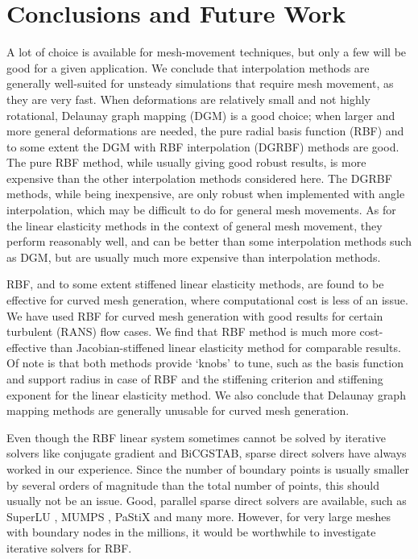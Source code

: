 \chapter{Conclusions and Future Work}

A lot of choice is available for mesh-movement techniques, but only a few will be good for a given application. We conclude that interpolation methods are generally well-suited for unsteady simulations that require mesh movement, as they are very fast. When deformations are relatively small and not highly rotational, Delaunay graph mapping (DGM) is a good choice; when larger and more general deformations are needed, the pure radial basis function (RBF) and to some extent the DGM with RBF interpolation (DGRBF) methods are good. The pure RBF method, while usually giving good robust results, is more expensive than the other interpolation methods considered here. The DGRBF methods, while being inexpensive, are only robust when implemented with angle interpolation, which may be difficult to do for general mesh movements. As for the linear elasticity methods in the context of general mesh movement, they perform reasonably well, and can be better than some interpolation methods such as DGM, but are usually much more expensive than interpolation methods.

RBF, and to some extent stiffened linear elasticity methods, are found to be effective for curved mesh generation, where computational cost is less of an issue. We have used RBF for curved mesh generation with good results for certain turbulent (RANS) flow cases. We find that RBF method is much more cost-effective than Jacobian-stiffened linear elasticity method for comparable results. Of note is that both methods provide `knobs' to tune, such as the basis function and support radius in case of RBF and the stiffening criterion and stiffening exponent for the linear elasticity method. We also conclude that Delaunay graph mapping methods are generally unusable for curved mesh generation.

Even though the RBF linear system sometimes cannot be solved by iterative solvers like conjugate gradient and BiCGSTAB, sparse direct solvers have always worked in our experience. Since the number of boundary points is usually smaller by several orders of magnitude than the total number of points, this should usually not be an issue. Good, parallel sparse direct solvers are available, such as SuperLU \cite{superlu}, MUMPS \cite{MUMPS}, PaStiX \cite{pastix} and many more. However, for very large meshes with boundary nodes in the millions, it would be worthwhile to investigate iterative solvers for RBF.

